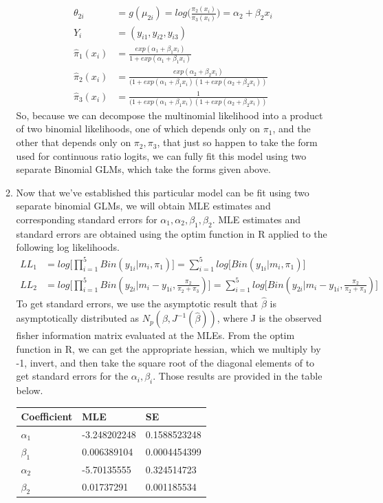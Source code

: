 \documentclass[12pt]{article}
\begin{document}
\begin{enumerate}
\begin{enumerate}
\begin{align*}
	\theta_{2i} &= g(\mu_{2i}) = log\bigg(\frac{\pi_2(x_i)}{\pi_3(x_i)}\bigg) = \alpha_2 + \beta_2 x_i\\
	Y_i &= (y_{i1}, y_{i2},y_{i3}) \\
	\hat{\pi}_1(x_i) &= \frac{exp(\alpha_1 + \beta_1 x_i)}{1 + exp(\alpha_1 + \beta_1 x_i)} \\ 
	\hat{\pi}_2(x_i) &= \frac{exp(\alpha_2 + \beta_2 x_i)}{(1 + exp(\alpha_1 + \beta_1 x_i)(1 + exp(\alpha_2 + \beta_2 x_i))} \\
	\hat{\pi}_3(x_i) &= \frac{1}{(1 + exp(\alpha_1 + \beta_1 x_i)(1 + exp(\alpha_2 + \beta_2 x_i))}
	\end{align*}
	So, because we can decompose the multinomial likelihood into a product of two binomial likelihoods, one of which depends only on $\pi_1$, and the other that depends only on $\pi_2, \pi_3$, that just so happen to take the form used for continuous ratio logits, we can fully fit this model using two separate Binomial GLMs, which take the forms given above.
	\item Now that we've established this particular model can be fit using two separate binomial GLMs, we will obtain MLE estimates and corresponding standard errors for $\alpha_1, \alpha_2, \beta_1, \beta_2$. MLE estimates and standard errors are obtained using the optim function in R applied to the following log likelihoods. 
	\begin{align*}
	LL_1 &= log\bigg[\prod_{i=1}^{5} Bin(y_{1i}|m_i, \pi_1)\bigg] = \sum_{i=1}^{5} log\bigg[Bin(y_{1i}|m_i, \pi_1)\bigg] \\ 
	LL_2 &= log\bigg[\prod_{i=1}^{5} Bin(y_{2i}|m_i-y_{1i}, \frac{\pi_2}{\pi_2 + \pi_3})\bigg] = \sum_{i=1}^{5} log\bigg[Bin(y_{2i}|m_i-y_{1i}, \frac{\pi_2}{\pi_2 + \pi_3})\bigg]
	\end{align*}
	To get standard errors, we use the asymptotic result that $\hat{\beta}$ is asymptotically distributed as $N_p(\beta, J^{-1}(\hat{\beta}))$, where J is the observed fisher information matrix evaluated at the MLEs. From the optim function in R, we can get the appropriate hessian, which we multiply by -1, invert, and then take the square root of the diagonal elements of to get standard errors for the $\alpha_i, \beta_i$. Those results are provided in the table below. 
	\begin{table}[htb]
		\centering
		\begin{tabular}{|l|l|l|}
			\hline
			Coefficient & MLE          & SE           \\ \hline
			$\alpha_1$  & -3.248202248 & 0.1588523248 \\ \hline
			$\beta_1$   & 0.006389104  & 0.0004454399 \\ \hline
			$\alpha_2$  & -5.70135555  & 0.324514723  \\ \hline
			$\beta_2$   & 0.01737291   & 0.001185534  \\ \hline
		\end{tabular}
	\end{table}
	

\end{enumerate}
\end{enumerate}
\end{document}
